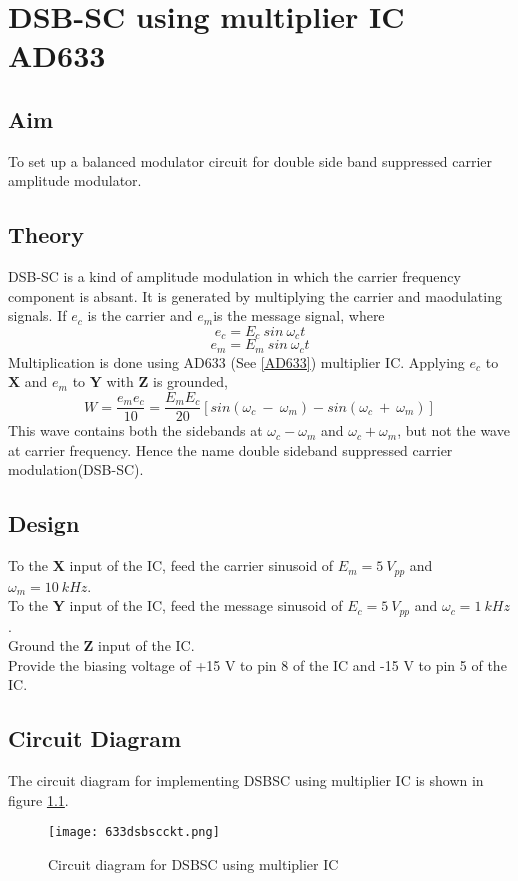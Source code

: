\chapter[DSB-SC using multiplier IC AD633]{DSB-SC using multiplier IC AD633}
\section*{Aim}
To set up a balanced modulator circuit for double side band suppressed carrier amplitude modulator.
\section*{Theory}
DSB-SC is a kind of amplitude modulation in which the carrier frequency component is absant. It is generated by multiplying the carrier and maodulating signals. If $e_c$ is the carrier and $e_m$is the message signal, where
\begin{equation}
e_c=E_c\  sin\ \omega_ct
\end{equation}
\begin{equation}
e_m=E_m\  sin\ \omega_ct
\end{equation}
Multiplication is done using AD633 (See \ref{AD633}) multiplier IC.
Applying $e_c$ to $\textbf{X}$ and $e_m$ to $\textbf{Y}$ with $\textbf{Z}$ is grounded, 
\begin{equation}
W= \frac{e_me_c}{10} = \frac{E_mE_c}{20} [sin (\omega_c\ -\ \omega_m)-sin (\omega_c\ +\ \omega_m)]
\end{equation}
This wave contains both the sidebands at $\omega_c-\omega_m$ and $\omega_c+\omega_m$, but not the wave at carrier frequency. Hence the name double sideband suppressed carrier modulation(DSB-SC).
\section*{Design}

To the \textbf{X} input of the IC, feed the carrier sinusoid of $E_m=5\ V_{pp}$ and $\omega_m= 10\ kHz$.\\
To the \textbf{Y} input of the IC, feed the message sinusoid of $E_c=5\ V_{pp}$ and $\omega_c= 1\ kHz$.\\
Ground the \textbf{Z} input of the IC.\\
Provide the biasing voltage of +15 V to pin 8 of the IC and -15 V to pin 5 of the IC.\\


\section*{Circuit Diagram}
The circuit diagram for implementing DSBSC using multiplier IC is shown in figure \ref{DSBSCckt}.
\begin{figure}[h]
\begin{center}
\texttt{[image: 633dsbscckt.png]}
\caption{Circuit diagram for DSBSC using multiplier IC}
\label{DSBSCckt}
\end{center}

\end{figure}

